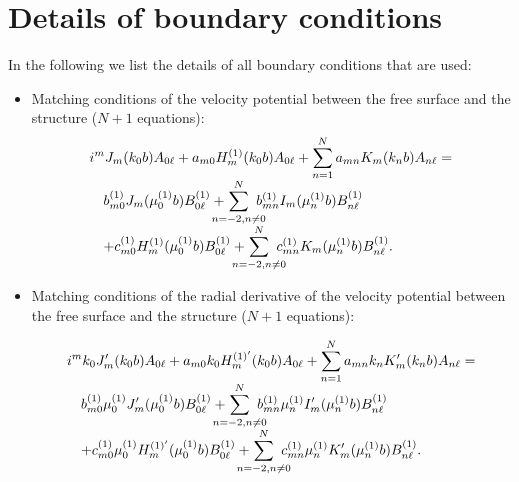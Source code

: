 \documentclass{jfm}
\begin{document}
\appendix
\section{Details of boundary conditions}
In the following we list the details of all boundary conditions that are used:
\begin{itemize}
  \item 
Matching conditions of the velocity potential between the free surface and the structure ($N+1$ equations):
\begin{eqnarray}
\begin{array}{l}
\displaystyle i^mJ_m(k_0b)A_{0\ell}+a_{m0}H_m^{(1)}(k_0b)A_{0\ell}+ \sum_{n=1}^{N} a_{mn} K_m(k_n b)A_{n\ell} = \\
\displaystyle \quad b_{m0}^{(1)}J_m(\mu^{(1)}_0 b)B_{0\ell}^{(1)}+ \hspace{-4mm} \sum_{n=-2,n\ne 0}^{N}\hspace{-3mm}b^{(1)}_{mn} I_m(\mu^{(1)}_n b) B_{n\ell}^{(1)} \\
\displaystyle \quad+c_{m0}^{(1)}H_m^{(1)}(\mu^{(1)}_0 b)B_{0\ell}^{(1)} + \hspace{-4mm} \sum_{n=-2,n\ne 0}^{N}\hspace{-3mm} c^{(1)}_{mn} K_m(\mu^{(1)}_n b) B_{n\ell}^{(1)}.
\end{array}
\end{eqnarray}


  \item 
Matching conditions of the radial derivative of the velocity potential between the free surface and the structure ($N+1$ equations):


\begin{eqnarray}
\begin{array}{l}
\displaystyle i^mk_0J'_m(k_0b)A_{0\ell}+a_{m0}k_0H_m^{(1)'}(k_0b)A_{0\ell}+ \sum_{n=1}^{N} a_{mn}k_n K'_m(k_n b)A_{n\ell} =  \\
\displaystyle \quad b_{m0}^{(1)}\mu^{(1)}_0J'_m(\mu^{(1)}_0 b)B_{0\ell}^{(1)}+ \hspace{-4mm} \sum_{n=-2,n\ne 0}^{N}\hspace{-3mm} b^{(1)}_{mn}\mu^{(1)}_n I'_m(\mu^{(1)}_n b) B_{n\ell}^{(1)} \\
\displaystyle \quad  +c_{m0}^{(1)}\mu^{(1)}_0H_m^{(1)'}(\mu^{(1)}_0 b)B_{0\ell}^{(1)} + \hspace{-4mm} \sum_{n=-2,n\ne 0}^{N}\hspace{-3mm}c^{(1)}_{mn}\mu^{(1)}_n K'_m(\mu^{(1)}_n b) B_{n\ell}^{(1)}.
\end{array}
\end{eqnarray}


\end{itemize}
\end{document}
